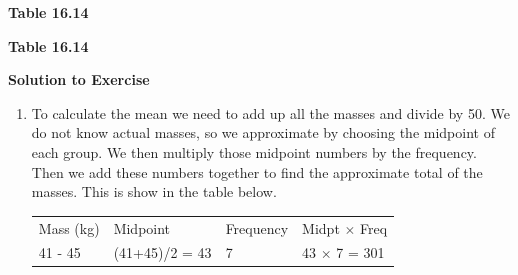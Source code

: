 \begin{description}[noitemsep]
\begin{description}[noitemsep]
{\begin{mdframed}[linewidth=4, leftmargin=40, rightmargin=40]
\begin{exercise}
\begin{table}
\begin{center}
\begin{xtabular}[t]{|l|l|}
     \tabularnewline{}
    \end{xtabular}
      \end{center}
    \begin{center}{\small\bfseries Table 16.14}\end{center}
    \begin{caption}{\small\bfseries Table 16.14}\end{caption}
\end{table}
    \par
        \vspace{5pt}
        \label{m39400*solfhsst!!!underscore!!!id2044}\noindent\textbf{Solution to Exercise } \label{m39400*listfhsst!!!underscore!!!id2044}\begin{enumerate}[noitemsep, label=\textbf{Step} \textbf{\arabic*}. ] 
            \leftskip=20pt\rightskip=\leftskip\item  
        \label{m39400*id215169}To calculate the mean we need to add up all the masses and divide by 50. We do not know actual masses, so we approximate by choosing the midpoint of each group. We then multiply those midpoint numbers by the frequency. Then we add these numbers together to find the approximate total of the masses. This is show in the table below.\par 
          \begin{table}
        \begin{center}
      \label{m39400*id215176}
    \noindent
      \tablelasttail{}
      \begin{xtabular}[t]{|l|l|l|l|}\hline
        Mass (kg) &
        Midpoint &
        Frequency &
        Midpt $\ensuremath{\times}$ Freq%
     \tabularnewline{}
        41 - 45 &
        (41+45)/2 = 43 &
        7 &
        43 $\ensuremath{\times}$ 7 = 301%
     \tabularnewline{}

\end{xtabular}
\end{center}
\end{table}
\end{enumerate}
\end{exercise}
\end{mdframed}}
\end{description}
\end{description}
